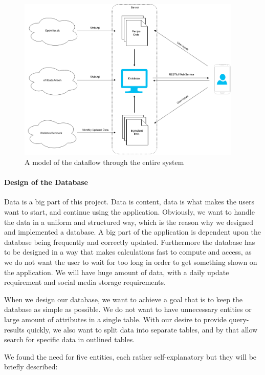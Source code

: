 \begin{figure}
\label{fig:dataflow}
\centering
\includegraphics[width=0.95\textwidth]{Pictures/dataflow}
\caption{A model of the dataflow through the entire system}
\end{figure}

\paragraph{Design of the Database}
\label{para:dbdesign}

Data is a big part of this project. Data is content, data is what makes the users want to start, and continue using the application. Obviously, we want to handle the data in a uniform and structured way, which is the reason why we designed and implemented a database. A big part of the application is dependent upon the database being frequently and correctly updated. Furthermore the database has to be designed in a way that makes calculations fast to compute and access, as we do not want the user to wait for too long in order to get something shown on the application. We will have huge amount of data, with a daily update requirement and social media storage requirements.

When we design our database, we want to achieve a goal that is to keep the database as simple as possible. We do not want to have unnecessary entities or large amount of attributes in a single table. With our desire to provide query-results quickly, we also want to split data into separate tables, and by that allow search for specific data in outlined tables. 

We found the need for five entities, each rather self-explanatory but they will be briefly described:

